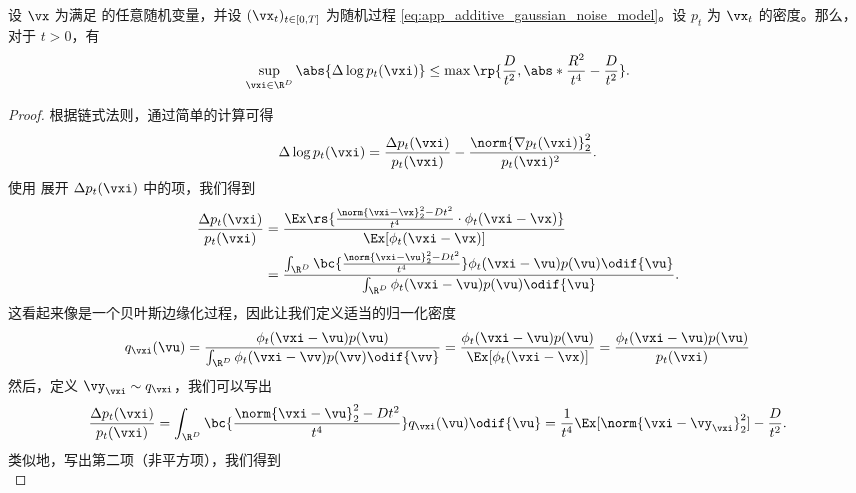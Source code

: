 \documentclass[../../book-main_zh.tex]{subfiles}
\begin{document}
\begin{lemma}\label{lem:app_diffusion_laplacian_control}
    设 \(\vx\) 为满足  的任意随机变量，并设 \((\vx_{t})_{t \in [0, T]}\) 为随机过程 \eqref{eq:app_additive_gaussian_noise_model}。设 \(p_{t}\) 为 \(\vx_{t}\) 的密度。那么，对于 \(t > 0\)，有
    \begin{equation}
        \sup_{\vxi \in \R^{D}}\abs{\Delta \log p_{t}(\vxi)} \leq
        \max\rp{\frac{D}{t^{2}}, \abs*{\frac{R^{2}}{t^{4}} - \frac{D}{t^{2}}}}.
    \end{equation}
\end{lemma}
\begin{proof}
    根据链式法则，通过简单的计算可得
    \begin{equation}
        \Delta \log p_{t}(\vxi) = \frac{\Delta
        p_{t}(\vxi)}{p_{t}(\vxi)} - \frac{\norm{\nabla
        p_{t}(\vxi)}_{2}^{2}}{p_{t}(\vxi)^{2}}.
    \end{equation}
    使用  展开 \(\Delta p_{t}(\vxi)\) 中的项，我们得到
    \begin{align}
        \frac{\Delta p_{t}(\vxi)}{p_{t}(\vxi)}
        &= \frac{\Ex\rs{\frac{\norm{\vxi - \vx}_{2}^{2} -
        Dt^{2}}{t^{4}} \cdot \phi_{t}(\vxi - \vx)}}{\Ex[\phi_{t}(\vxi
        - \vx)]} \\
        &= \frac{\int_{\R^{D}}\bc{\frac{\norm{\vxi - \vu}_{2}^{2} -
            Dt^{2}}{t^{4}}}\phi_{t}(\vxi -
        \vu)p(\vu)\odif{\vu}}{\int_{\R^{D}}\phi_{t}(\vxi -
        \vu)p(\vu)\odif{\vu}}.
    \end{align}
    这看起来像是一个贝叶斯边缘化过程，因此让我们定义适当的归一化密度
    \begin{equation}
        q_{\vxi}(\vu) = \frac{\phi_{t}(\vxi -
        \vu)p(\vu)}{\int_{\R^{D}}\phi_{t}(\vxi -
        \vv)p(\vv)\odif{\vv}} = \frac{\phi_{t}(\vxi -
        \vu)p(\vu)}{\Ex[\phi_{t}(\vxi - \vx)]} = \frac{\phi_{t}(\vxi
        - \vu)p(\vu)}{p_{t}(\vxi)}
    \end{equation}
    然后，定义 \(\vy_{\vxi} \sim q_{\vxi}\)，我们可以写出
    \begin{equation}
        \frac{\Delta p_{t}(\vxi)}{p_{t}(\vxi)} =
        \int_{\R^{D}}\bc{\frac{\norm{\vxi - \vu}_{2}^{2} -
        Dt^{2}}{t^{4}}}q_{\vxi}(\vu)\odif{\vu} =
        \frac{1}{t^{4}}\Ex[\norm{\vxi - \vy_{\vxi}}_{2}^{2}] - \frac{D}{t^{2}}.
    \end{equation}
    类似地，写出第二项（非平方项），我们得到
    \begin{equation}

\end{equation}
\end{proof}
\end{document}
